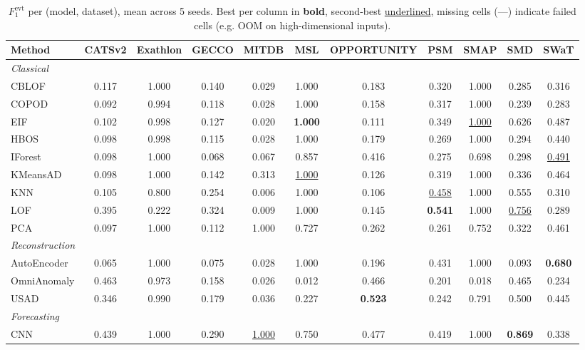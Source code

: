 \begin{table}[t]
\centering
\small
\caption{$F_1^{\text{evt}}$ per (model, dataset), mean across 5 seeds. Best per column in \textbf{bold}, second-best \underline{underlined}, missing cells (---) indicate failed cells (e.g. OOM on high-dimensional inputs).}
\label{tab:by-dataset-event-based-f1}
\begin{tabular}{lcccccccccc}
\toprule
Method & CATSv2 & Exathlon & GECCO & MITDB & MSL & OPPORTUNITY & PSM & SMAP & SMD & SWaT \\
\midrule
\multicolumn{11}{l}{\textit{Classical}} \\
CBLOF & 0.117 & 1.000 & 0.140 & 0.029 & 1.000 & 0.183 & 0.320 & 1.000 & 0.285 & 0.316 \\
COPOD & 0.092 & 0.994 & 0.118 & 0.028 & 1.000 & 0.158 & 0.317 & 1.000 & 0.239 & 0.283 \\
EIF & 0.102 & 0.998 & 0.127 & 0.020 & \textbf{1.000} & 0.111 & 0.349 & \underline{1.000} & 0.626 & 0.487 \\
HBOS & 0.098 & 0.998 & 0.115 & 0.028 & 1.000 & 0.179 & 0.269 & 1.000 & 0.294 & 0.440 \\
IForest & 0.098 & 1.000 & 0.068 & 0.067 & 0.857 & 0.416 & 0.275 & 0.698 & 0.298 & \underline{0.491} \\
KMeansAD & 0.098 & 1.000 & 0.142 & 0.313 & \underline{1.000} & 0.126 & 0.319 & 1.000 & 0.336 & 0.464 \\
KNN & 0.105 & 0.800 & 0.254 & 0.006 & 1.000 & 0.106 & \underline{0.458} & 1.000 & 0.555 & 0.310 \\
LOF & 0.395 & 0.222 & 0.324 & 0.009 & 1.000 & 0.145 & \textbf{0.541} & 1.000 & \underline{0.756} & 0.289 \\
PCA & 0.097 & 1.000 & 0.112 & 1.000 & 0.727 & 0.262 & 0.261 & 0.752 & 0.322 & 0.461 \\
\midrule
\multicolumn{11}{l}{\textit{Reconstruction}} \\
AutoEncoder & 0.065 & 1.000 & 0.075 & 0.028 & 1.000 & 0.196 & 0.431 & 1.000 & 0.093 & \textbf{0.680} \\
OmniAnomaly & 0.463 & 0.973 & 0.158 & 0.026 & 0.012 & 0.466 & 0.201 & 0.018 & 0.465 & 0.234 \\
USAD & 0.346 & 0.990 & 0.179 & 0.036 & 0.227 & \textbf{0.523} & 0.242 & 0.791 & 0.500 & 0.445 \\
\midrule
\multicolumn{11}{l}{\textit{Forecasting}} \\
CNN & 0.439 & 1.000 & 0.290 & \underline{1.000} & 0.750 & 0.477 & 0.419 & 1.000 & \textbf{0.869} & 0.338 \\

\end{tabular}
\end{table}
